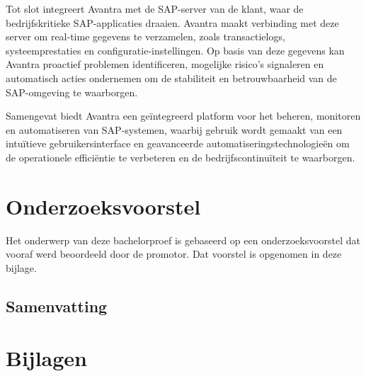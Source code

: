 \documentclass[dutch,dit,thesis]{hogentreport}
\begin{document}
Tot slot integreert Avantra met de SAP-server van de klant, waar de bedrijfskritieke SAP-applicaties draaien. Avantra maakt verbinding met deze server om real-time gegevens te verzamelen, zoals transactielogs, systeemprestaties
 en configuratie-instellingen. Op basis van deze gegevens kan Avantra proactief problemen identificeren, mogelijke risico's signaleren en automatisch acties ondernemen om de stabiliteit en betrouwbaarheid van de SAP-omgeving te waarborgen.

Samengevat biedt Avantra een geïntegreerd platform voor het beheren, monitoren en automatiseren van SAP-systemen, waarbij gebruik wordt gemaakt van een intuïtieve gebruikersinterface en geavanceerde 
automatiseringstechnologieën om de operationele efficiëntie te verbeteren en de bedrijfscontinuïteit te waarborgen.




%
%




\appendix

\chapter{Onderzoeksvoorstel}

Het onderwerp van deze bachelorproef is gebaseerd op een onderzoeksvoorstel dat vooraf werd beoordeeld door de promotor. Dat voorstel is opgenomen in deze bijlage.




\section*{Samenvatting}






%

\chapter{Bijlagen}
\end{document}
